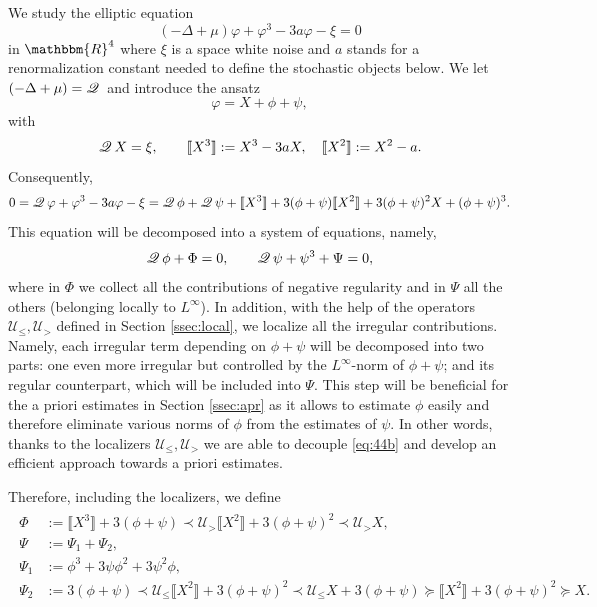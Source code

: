 \documentclass[a4paper,11pt]{article}
\newcommand{\assign}{:=}
\numberwithin{equation}{section}
\newcommand{\UU}{\mathscr{U}}
\newcommand{\Q}{\mathscr{Q} \hspace{.2em}}
\newcommand{\8}{\infty}
\begin{document}
We  study the elliptic equation
\begin{equation*}%
(- \Delta + \mu) \varphi + \varphi^3 - 3 a \varphi - \xi = 0
\end{equation*}
in $\mathbbm{R}^4$ where $\xi$ is a space white noise and $a$ stands for a renormalization constant needed to define the stochastic objects below. We let $(- \Delta +
\mu) = \Q$ and introduce the ansatz
\[ \varphi = X + \phi + \psi, \]
with
\begin{equation*}%
 \Q X = \xi, \qquad \llbracket X^3 \rrbracket \assign X^3 - 3 a X, \quad
   \llbracket X^2 \rrbracket \assign X^2 - a.
\end{equation*}
Consequently,
\[ 0 = \Q \varphi + \varphi^3 - 3 a \varphi - \xi = \Q \phi + \Q \psi +
   \llbracket X^3 \rrbracket + 3 (\phi + \psi) \llbracket X^2 \rrbracket + 3
   (\phi + \psi)^2 X + (\phi + \psi)^3 . \]
This equation will be decomposed into a system of equations, namely,
\begin{equation}\label{eq:44b}
\Q \phi + \Phi = 0, \qquad \Q \psi + \psi^3 + \Psi = 0,
\end{equation}
where in $\Phi$ we collect all the contributions of negative regularity and in
$\Psi$ all the others (belonging locally to $L^{\infty}$). In addition, with the help of  the operators $\UU_{\leqslant},
\UU_{>}$ defined in Section \ref{ssec:local}, we localize all the irregular contributions. Namely, each irregular term depending on $\phi+\psi$ will be decomposed into two parts: one even more irregular but controlled by the $L^{\8}$-norm of $\phi+\psi$; and its regular counterpart, which will be included into $\Psi$. This step will be beneficial for the a priori estimates in Section \ref{ssec:apr} as it allows to estimate $\phi$ easily and therefore  eliminate various norms of $\phi$ from the estimates of $\psi$. In other words, thanks to the localizers $\UU_{\leqslant}, \UU_{>}$ we are able to decouple \eqref{eq:44b} and develop an efficient approach towards a priori estimates.

Therefore, including the localizers, we define
\begin{align}\label{eq:44c}
\begin{aligned}
\Phi &:= \llbracket X^3 \rrbracket + 3 (\phi + \psi) \prec \UU_{>}
   \llbracket X^2 \rrbracket + 3 (\phi + \psi)^2 \prec \UU_{>} X,\\
    \Psi &:= \Psi_1 + \Psi_2, \\
     \Psi_1 &:= \phi^3 + 3 \psi \phi^2 + 3 \psi^2 \phi,\\
     \Psi_2 &:= 3 (\phi + \psi) \prec \UU_{\leqslant} \llbracket X^2
   \rrbracket + 3 (\phi + \psi)^2 \prec \UU_{\leqslant} X + 3 (\phi +
   \psi) \succcurlyeq \llbracket X^2 \rrbracket + 3 (\phi + \psi)^2
   \succcurlyeq X.
\end{aligned}
\end{align}   
 
\end{document}
